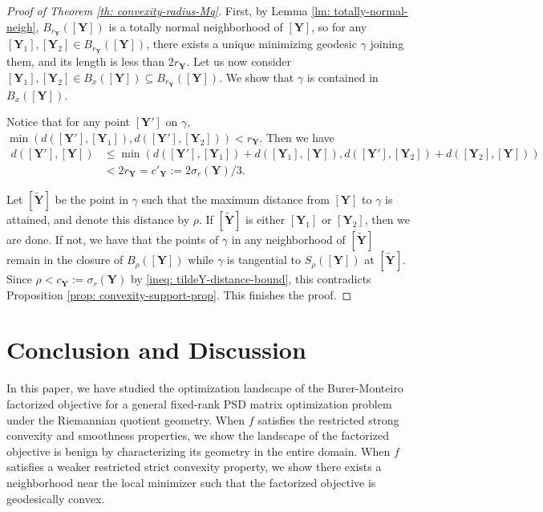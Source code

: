 \documentclass[11pt]{article}
\newcommand{\0}{{\mathbf{0}}}
\newcommand{\1}{{\mathbf{1}}}
\newcommand{\Y}{{\mathbf{Y}}}
\newcommand{\nc}{\normalcolor}
\begin{document}
\begin{proof}[Proof of Theorem \ref{th: convexity-radius-Mq}]
	First, by Lemma \ref{lm: totally-normal-neigh}, $B_{r_\Y }([\Y])$ is a totally normal neighborhood of $[\Y]$, so for any $[\Y_1], [\Y_2] \in B_{r_\Y }([\Y])$, there exists a unique minimizing geodesic $\gamma$ joining them, and its length is less than $2 r_\Y$. 
	Let us now consider $[\Y_1], [\Y_2] \in B_x([\Y]) \subseteq B_{r_\Y }([\Y])$. We show that $\gamma$ is contained in $B_{x }([\Y])$.
	\nc
	
	Notice that for any point $[\Y']$ on $\gamma$, $\min(d([\Y'],[\Y_1]), d([\Y'],[\Y_2])) < r_\Y$. Then we have
	\begin{equation} \label{ineq: tildeY-distance-bound}
	\begin{split}
		d([\Y'],[\Y]) &\leq \min( d([\Y'], [\Y_1]) + d([\Y_1],[\Y]) , d([\Y'],[\Y_2]) + d([\Y_2],[\Y])  )\\
		& < 2 r_\Y  = c'_\Y := 2\sigma_r(\Y)/3. 
	\end{split}
 	\end{equation}
	
	Let $[\widetilde{\Y}]$ be the point in $\gamma$ such that the maximum distance from $[\Y]$ to $\gamma$ is attained, and denote this distance by $\rho$. If $[\widetilde{\Y}]$ is either $[\Y_1]$ or $[\Y_2]$, then we are done. If not, we have that the points of $\gamma$ in any neighborhood of $[\widetilde{\Y}]$ remain in the closure of $B_{\rho}([\Y])$ while $\gamma$ is tangential to $S_\rho([\Y])$ at $[\widetilde{\Y}]$. Since $\rho < c_\Y:= \sigma_r(\Y)$ by \eqref{ineq: tildeY-distance-bound},  this contradicts Proposition \ref{prop: convexity-support-prop}. This finishes the proof.
\end{proof}

\section{Conclusion and Discussion} \label{sec: conclusion}
In this paper, we have studied the optimization landscape of the Burer-Monteiro factorized objective for a general fixed-rank PSD matrix optimization problem under the Riemannian quotient geometry. When $f$ satisfies the restricted strong convexity and smoothness properties, we show the landscape of the factorized objective is benign by characterizing its geometry in the entire domain. When $f$ satisfies a weaker restricted strict convexity property, we show there exists a neighborhood near the local minimizer such that the factorized objective is geodesically convex. 
\end{document}
